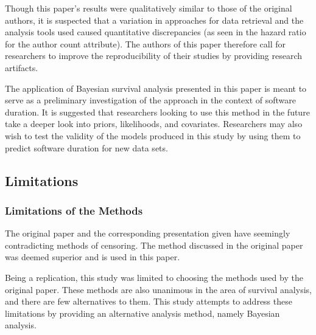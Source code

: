 \documentclass[sigconf]{acmart}
\begin{document}
Though this paper's results were qualitatively similar to those of the original authors, it is suspected that a variation in approaches for data retrieval and the analysis tools used caused quantitative discrepancies (as seen in the hazard ratio for the author count attribute).
The authors of this paper therefore call for researchers to improve the reproducibility of their studies by providing research artifacts.

The application of Bayesian survival analysis presented in this paper is meant to serve as a preliminary investigation of the approach in the context of software duration.
It is suggested that researchers looking to use this method in the future take a deeper look into priors, likelihoods, and covariates.
Researchers may also wish to test the validity of the models produced in this study by using them to predict software duration for new data sets.

\subsection{Limitations} \label{limit}

\subsubsection{Limitations of the Methods} \label{limit-methods}

The original paper \cite{ali2020cheating} and the corresponding presentation given \cite{ali2020video} have seemingly contradicting methods of censoring.
The method discussed in the original paper was deemed superior and is used in this paper.


Being a replication, this study was limited to choosing the methods used by the original paper.
These methods are also unanimous in the area of survival analysis, and there are few alternatives to them.
This study attempts to address these limitations by providing an alternative analysis method, namely Bayesian analysis.
\end{document}
